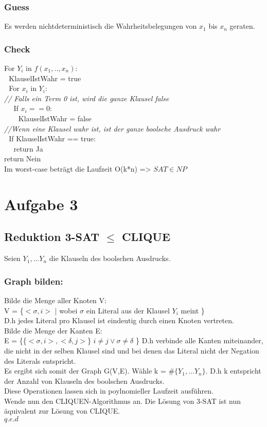 \documentclass[a4paper,11pt,twoside]{article}
\begin{document}
\subsubsection*{Guess}
Es werden nichtdeterministisch die Wahrheitsbelegungen von $x_1$ bis $x_n$ geraten.
\subsubsection*{Check}

For $Y_i$ in $f(x_1,.., x_n)$:\\
$~~~$KlauselIstWahr = true\\
$~~~$For $x_i$ in $Y_i$:\\
\textit{// Falls ein Term 0 ist, wird die ganze Klausel false}\\
$~~~~~~$If $x_i == 0$:\\ 
$~~~~~~~~~$KlauselIstWahr = false\\
\textit{//Wenn eine Klausel wahr ist, ist der ganze boolsche Ausdruck wahr}\\
$~~~$If KlauselIstWahr == true:\\
$~~~~~~$return Ja\\
return Nein\\

Im worst-case beträgt die Laufzeit O(k*n) => $SAT \in NP$



\section*{Aufgabe 3}
\subsection*{Reduktion 3-SAT $\le$ CLIQUE}
Seien $Y_1, ... Y_n$ die Klauseln des boolschen Ausdrucks.

\subsubsection*{Graph bilden:}
Bilde die Menge aller Knoten V:\\
V = \{$<\sigma, i>$ | wobei $\sigma$ ein Literal aus der Klausel $Y_i$ meint \}\\
D.h jedes Literal pro Klausel ist eindeutig durch einen Knoten vertreten.\\

Bilde die Menge der Kanten E:\\
E = \{\{$<\sigma, i>, <\delta, j>$\} $i \not= j \lor \sigma \not= \delta$ \}
D.h verbinde alle Kanten miteinander, die nicht in der selben Klausel sind und bei denen das Literal nicht der Negation des Literals entspricht.\\

Es ergibt sich somit der Graph G(V,E). Wähle k = $\#\{Y_1, ... Y_n\}$. D.h k entspricht der Anzahl von Klauseln des boolschen Ausdrucks.\\
Diese Operationen lassen sich in poylnomieller Laufzeit ausführen.\\

Wende nun den CLIQUEN-Algorithmus an. Die Lösung von 3-SAT ist nun äquivalent zur Lösung von CLIQUE.\\

$q.e.d$
\end{document}
